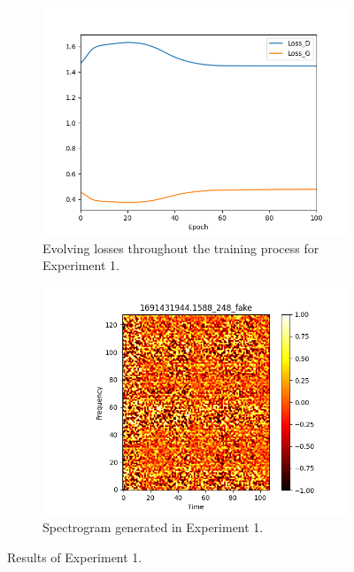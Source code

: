 \begin{figure}[!ht]
    \centering
    \begin{subfigure}{0.45\textwidth}
        \includegraphics[width=\textwidth]{figures/4.5-results/exp1_loss.png}
        \caption{Evolving losses throughout the training process for Experiment 1.}
        \label{fig:exp1_loss}
    \end{subfigure}
    \begin{subfigure}{0.45\textwidth}
        \includegraphics[width=\textwidth]{figures/4.5-results/exp1_spectrogram.png}
        \caption{Spectrogram generated in Experiment 1.}
        \label{fig:exp1_spectrogram}
    \end{subfigure}
    \caption{Results of Experiment 1.}
    \label{fig:exp1_results}
\end{figure}